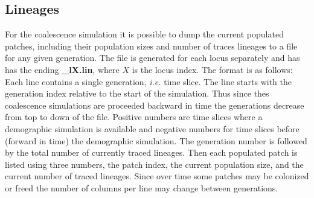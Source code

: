 \documentclass[letterpaper,12pt,oneside]{book}
\begin{document}
\subsection{Lineages}\label{coalLineages}
For the coalescence simulation it is possible to dump the current populated patches, including their population sizes and number of traces lineages to a file for any given generation. The file is generated for each locus separately and has has the ending \textbf{\_lX.lin}, where $X$ is the locus index. The format is as follows: Each line contains a single generation, \textit{i.e.} time slice. The line starts with the generation index relative to the start of the simulation. Thus since thes coalescence simulations are proceeded backward in time the generations decrease from top to down of the file. Positive numbers are time slices where a demographic simulation is available and negative numbers for time slices before (forward in time) the demographic simulation. The generation number is followed by the total number of currently traced lineages. Then each populated patch is listed using three numbers, the patch index, the current population size, and the current number of traced lineages. Since over time some patches may be colonized or freed the number of columns per line may change between generations.
\end{document}
